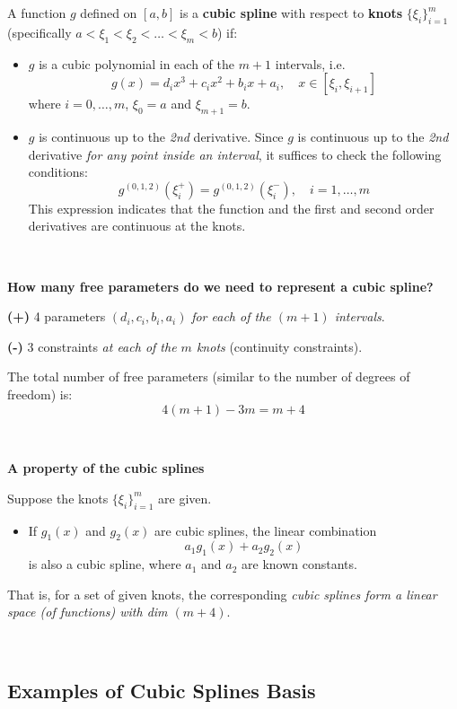 \documentclass[
]{book}
\providecommand{\tightlist}{%
  \setlength{\itemsep}{0pt}\setlength{\parskip}{0pt}}
\begin{document}
A function \(g\) defined on \([a,b]\) is a \textbf{cubic spline} with respect to \textbf{knots} \(\{\xi_i\}_{i=1}^m\) (specifically \(a<\xi_1<\xi_2<\ldots<\xi_m<b\)) if:

\begin{itemize}
\item
  \(g\) is a cubic polynomial in each of the \(m+1\) intervals, i.e.
  \[g(x) =d_ix^3+c_ix^2+b_ix+a_i,\quad x\in [\xi_i,\xi_{i+1}]\]
  where \(i=0,\ldots, m\), \(\xi_0=a\) and \(\xi_{m+1}=b\).
\item
  \(g\) is continuous up to the \emph{2nd} derivative. Since \(g\) is continuous up to the \emph{2nd} derivative \emph{for any point inside an interval}, it suffices to check the following conditions:
  \[g^{(0,1,2)} (\xi_i^+)=g^{(0,1,2)}(\xi_i^-),\quad i=1, \ldots, m\]
  This expression indicates that the function and the first and second order derivatives are continuous at the knots.
\end{itemize}

~

\textbf{How many free parameters do we need to represent a cubic spline?}

\textbf{(+)} 4 parameters \((d_i,c_i,b_i,a_i)\) \emph{for each of the \((m+1)\) intervals}.

\textbf{(-)} 3 constraints \emph{at each of the \(m\) knots} (continuity constraints).

The total number of free parameters (similar to the number of degrees of freedom) is:
\[4(m+1) - 3m = m + 4\]

~

\textbf{A property of the cubic splines}

Suppose the knots \(\{\xi_i\}_{i=1}^m\) are given.

\begin{itemize}
\tightlist
\item
  If \(g_1(x)\) and \(g_2(x)\) are cubic splines, the linear combination
  \[a_1g_1(x)+a_2g_2(x)\]
  is also a cubic spline, where \(a_1\) and \(a_2\) are known constants.~
\end{itemize}

That is, for a set of given knots, the corresponding \emph{cubic splines form a linear space (of functions) with dim \((m + 4)\)}.

~

\subsection{Examples of Cubic Splines Basis}\label{examples-of-cubic-splines-basis}
\end{document}
